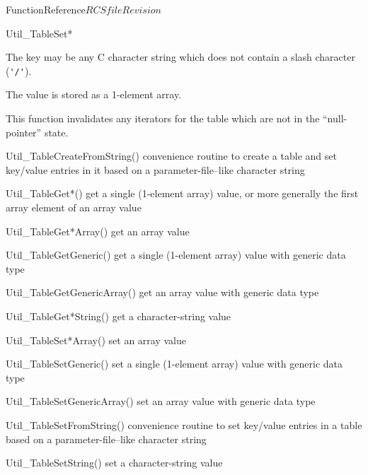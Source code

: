 \begin{cactuspart}{FunctionReference}{$RCSfile$}{$Revision$}
\begin{FunctionDescription}{Util\_TableSet*}
\begin{Discussion}
The key may be any C character string which does not contain a slash
character (\verb|'/'|).

The value is stored as a 1-element array.

This function invalidates any iterators for the table which are
not in the ``null-pointer'' state.
\end{Discussion}

\begin{SeeAlsoSection}
\begin{SeeAlso}{Util\_TableCreateFromString()}
convenience routine to create a table and set key/value entries
in it based on a parameter-file--like character string
\end{SeeAlso}
\begin{SeeAlso}{Util\_TableGet*()}
get a single (1-element array) value,
or more generally the first array element of an array value
\end{SeeAlso}
\begin{SeeAlso}{Util\_TableGet*Array()}
get an array value
\end{SeeAlso}
\begin{SeeAlso}{Util\_TableGetGeneric()}
get a single (1-element array) value with generic data type
\end{SeeAlso}
\begin{SeeAlso}{Util\_TableGetGenericArray()}
get an array value with generic data type
\end{SeeAlso}
\begin{SeeAlso}{Util\_TableGet*String()}
get a character-string value
\end{SeeAlso}
\begin{SeeAlso}{Util\_TableSet*Array()}
set an array value
\end{SeeAlso}
\begin{SeeAlso}{Util\_TableSetGeneric()}
set a single (1-element array) value with generic data type
\end{SeeAlso}
\begin{SeeAlso}{Util\_TableSetGenericArray()}
set an array value with generic data type
\end{SeeAlso}
\begin{SeeAlso}{Util\_TableSetFromString()}
convenience routine to set key/value entries in a table based on a
parameter-file--like character string
\end{SeeAlso}
\begin{SeeAlso}{Util\_TableSetString()}
set a character-string value
\end{SeeAlso}
\end{SeeAlsoSection}


\end{FunctionDescription}
\end{cactuspart}
